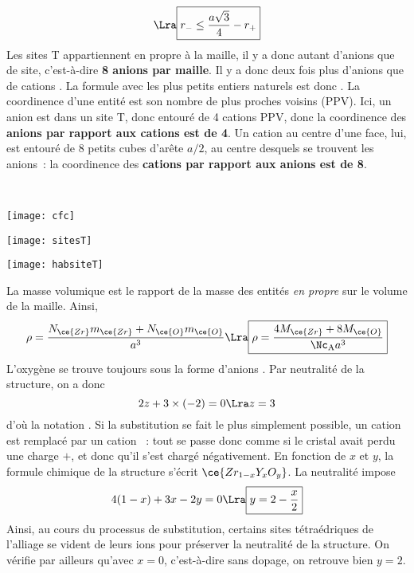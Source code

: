 \documentclass[11pt]{book}
\begin{document}
{\begin{minipage}[t]{.73\linewidth}
\begin{enumerate}[start=2]
\[				\Lra
				\boxed{r_- \leq \frac{a \sqrt{3}}{4} - r_+}
			\]
			 Les sites T appartiennent en propre à la maille, il y a donc autant
			d'anions que de site, c'est-à-dire \textbf{8 anions par maille}.
			 Il y a donc deux fois plus d'anions  que de cations
			. La formule avec les plus petits entiers naturels est donc
			.
			 La coordinence d'une entité est son nombre de plus proches voisins
			(PPV). Ici, un anion est dans un site T, donc entouré de 4 cations PPV, donc
			la coordinence des \textbf{anions par rapport aux cations est de 4}. Un cation
			au centre d'une face, lui, est entouré de 8 petits cubes d'arête $a/2$, au
			centre desquels se trouvent les anions~: la coordinence des \textbf{cations
				par rapport aux anions est de 8}.
		\end{enumerate}
	\end{minipage}
	\hfill
	\begin{minipage}[t]{.25\linewidth}
		~
		\begin{center}
			\texttt{[image: cfc]}
			\label{fig:cfc}
		\end{center}
		\begin{center}
			\texttt{[image: sitesT]}
			\label{fig:sitesT}
		\end{center}
		\begin{center}
			\texttt{[image: habsiteT]}
			\label{fig:habsiteT}
		\end{center}
	\end{minipage}
	\begin{enumerate}[start=9]
		 La masse volumique est le rapport de la masse des entités \textit{en
			propre} sur le volume de la maille. Ainsi,
		\[
			\rho = \frac{N_{\ce{Zr}} m_{\ce{Zr}} + N_{\ce{O}} m_{\ce{O}}}{a^3}
			\Lra
			\boxed{\rho = \frac{4M_{\ce{Zr}} + 8M_{\ce{O}}}{\Nc_{\rm A}a^3}}
		\]
		 L'oxygène se trouve toujours sous la forme d'anions . Par
		neutralité de la structure, on a donc
		\[
			2z + 3 \times (-2) = 0
			\Lra
			z=3
		\]
		d'où la notation .
		 Si la substitution se fait le plus simplement possible, un cation
		 est remplacé par un cation ~: tout se passe donc comme
		si le cristal avait perdu une charge $+$, et donc qu'il s'est chargé
		négativement.
		 En fonction de $x$ et $y$, la formule chimique de la structure
		s'écrit $\ce{Zr_{1-x}Y_{x}O_{y}}$. La neutralité impose
		\[
			4(1-x) + 3x -2y = 0
			\Lra
			\boxed{y = 2 - \frac{x}{2}}
		\]
		Ainsi, au cours du processus de substitution, certains sites tétraédriques de
		l'alliage se vident de leurs ions  pour préserver la neutralité de
		la structure. On vérifie par ailleurs qu'avec $x=0$, c'est-à-dire sans dopage,
		on retrouve bien $y=2$.
	\end{enumerate}
}
\vspace*{-10pt}
\end{document}
